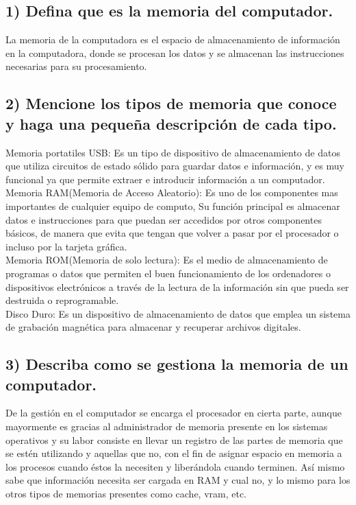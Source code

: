 \documentclass{article}
\begin{document}
\subsection*{1) Defina que es la memoria del computador.} 
La memoria de la computadora es el espacio de almacenamiento de información   en la computadora, donde se procesan los datos y se almacenan las instrucciones necesarias para su procesamiento.
\cite{aguilera2015modulo}


 \subsection*{2) Mencione los tipos de memoria que conoce y haga una pequeña descripción de cada tipo.}
Memoria portatiles USB:
Es un tipo de dispositivo de almacenamiento de datos que utiliza circuitos de estado sólido para guardar datos e información, y es muy funcional ya que permite extraer e introducir información a un computador.\cite{barrero2005sistema}\\[0.1cm]


Memoria RAM(Memoria de Acceso Aleatorio):
Es uno de los componentes mas importantes de cualquier equipo de computo, Su función principal es almacenar datos e instrucciones para que puedan ser accedidos por otros componentes básicos, de manera que evita que tengan que volver a pasar por el procesador o incluso por la tarjeta gráfica.\\[0.1cm]

Memoria ROM(Memoria de solo lectura):
Es el medio de almacenamiento de programas o datos que permiten el buen funcionamiento de los ordenadores o dispositivos electrónicos a través de la lectura de la información sin que pueda ser destruida o reprogramable.\\[0.1cm]

Disco Duro:
Es un dispositivo de almacenamiento de datos que emplea un sistema de grabación magnética para almacenar y recuperar archivos digitales.

\subsection*{3) Describa como se gestiona la memoria de un computador.}
De la gestión en el computador se encarga el procesador en cierta parte, aunque mayormente es gracias al administrador de memoria presente en los sistemas operativos y su labor consiste en llevar un registro de las partes de memoria que se estén utilizando y aquellas que no, con el fin de asignar espacio en memoria a los procesos cuando éstos la necesiten y liberándola cuando terminen. Así mismo sabe que información necesita ser cargada en RAM y cual no, y lo mismo para los otros tipos de memorias presentes como cache, vram, etc.
\end{document}
